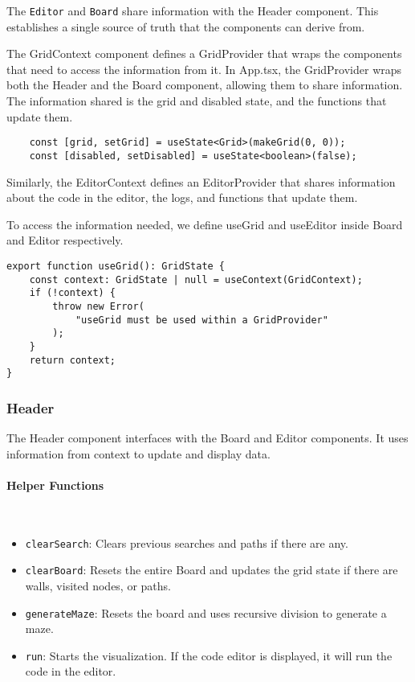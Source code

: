 The \texttt{Editor} and \texttt{Board} share information with the Header component. This establishes a single source of truth that the components can derive from.

The GridContext component defines a GridProvider that wraps the components that need to access the information from it. In App.tsx, the GridProvider wraps both the Header and the Board component, allowing them to share information.
The information shared is the grid and disabled state, and the functions that update them.

\begin{verbatim}
    const [grid, setGrid] = useState<Grid>(makeGrid(0, 0));
    const [disabled, setDisabled] = useState<boolean>(false);
\end{verbatim}

Similarly, the EditorContext defines an EditorProvider that shares information about the code in the editor, the logs, and functions that update them.

To access the information needed, we define useGrid and useEditor inside Board and Editor respectively.

\begin{verbatim}
export function useGrid(): GridState {
    const context: GridState | null = useContext(GridContext);
    if (!context) {
        throw new Error(
            "useGrid must be used within a GridProvider"
        );
    }
    return context;
}
\end{verbatim}

\subsubsection{Header}

The Header component interfaces with the Board and Editor components. It uses information from context to update and display data.

\paragraph{Helper Functions} \

\begin{itemize}
    \item \texttt{clearSearch}: Clears previous searches and paths if there are any.
    \item \texttt{clearBoard}: Resets the entire Board and updates the grid state if there are walls, visited nodes, or paths.
    \item \texttt{generateMaze}: Resets the board and uses recursive division to generate a maze.
    \item \texttt{run}: Starts the visualization. If the code editor is displayed, it will run the code in the editor.
\end{itemize}

